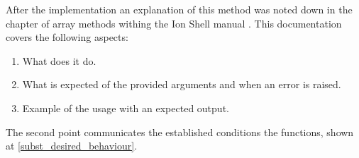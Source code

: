 After the implementation an explanation of this method was noted down in the chapter of array methods withing the Ion Shell manual \cite{ion_manual_array_methods}.
This documentation covers the following aspects:

\begin{enumerate}
	\item What does it do.
	\item What is expected of the provided arguments and when an error is raised.
	\item Example of the usage with an expected output.
\end{enumerate}

The second point communicates the established conditions the functions, shown at \ref{subst_desired_behaviour}.

